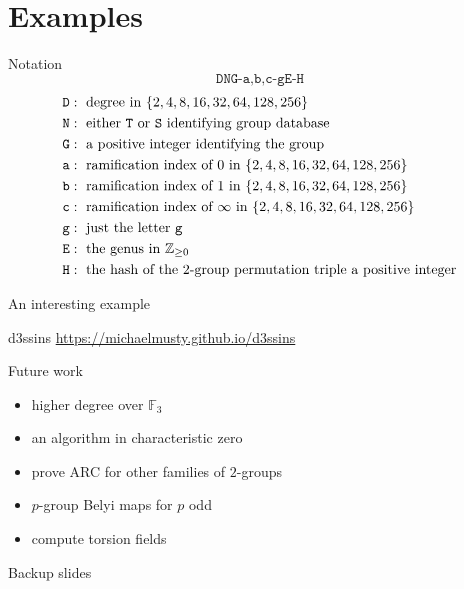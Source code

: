 \documentclass[xcolor=dvipsnames,handout]{beamer}
\theoremstyle{plain}
\newcommand{\ZZ}{\mathbb Z}
\newcommand{\FF}{\mathbb{F}}
\begin{document}
  \section{Examples}{
    \begin{frame}{Notation}
      \begin{equation*}
        \texttt{DNG-a,b,c-gE-H}
      \end{equation*}
      \begin{align*}
        \texttt{D} &:\text{ degree in }
        \{2,4,8,16,32,64,128,256\}\\
        \texttt{N} &:\text{ either \texttt{T}
        or \texttt{S} identifying group
        database}\\
        \texttt{G} &:\text{ a positive integer
        identifying the group}\\
        \texttt{a} &:\text{ ramification index
        of $0$ in }
        \{2,4,8,16,32,64,128,256\}\\
        \texttt{b} &:\text{ ramification index
        of $1$ in }
        \{2,4,8,16,32,64,128,256\}\\
        \texttt{c} &:\text{ ramification index
        of $\infty$ in }
        \{2,4,8,16,32,64,128,256\}\\
        \texttt{g} &:\text{ just the letter 
        \texttt{g}}\\
        \texttt{E} &:\text{ the genus in }
        \ZZ_{\geq 0}\\
        \texttt{H} &:\text{ the hash
        of the $2$-group permutation triple 
        a positive integer}
      \end{align*}
    \end{frame}
    \begin{frame}{An interesting example}
    \end{frame}
    \begin{frame}{d3ssins}
        \url{https://michaelmusty.github.io/d3ssins}
    \end{frame}
  }
  \begin{frame}{Future work}
    \begin{itemize}
      \item
        higher degree over $\FF_3$
      \item
        an algorithm in characteristic zero
      \item
        prove ARC for other families of $2$-groups
      \item
        $p$-group Belyi maps for $p$ odd
      \item
        compute torsion fields
    \end{itemize}
  \end{frame}
  \appendix
  \begin{frame}{Backup slides}
  \end{frame}
\end{document}

